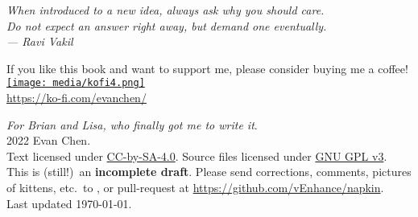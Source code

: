 \begin{titlepage}
	\vspace*{3cm}
	\begin{flushright}
		\large\itshape
		When introduced to a new idea, always ask why you should care. \\[0.2cm]
		Do not expect an answer right away, but demand one eventually. \\[0.8cm]
		--- Ravi Vakil \cite{ref:vakil}
	\end{flushright}

	\vspace*{8em}
	\hrulebar

	\begin{center}
	\begin{minipage}{50ex}
		\centering
		If you like this book and want to support me,
		please consider buying me a coffee! \\[2ex]
		\href{https://ko-fi.com/evanchen}{\texttt{[image: media/kofi4.png]}} \\
		\url{https://ko-fi.com/evanchen/}
	\end{minipage}
	\end{center}

	\vfill
	{
	\small
	\noindent \emph{For Brian and Lisa, who finally got me to write it}. \\[0.4cm]
	\noindent {\copyright} 2022 Evan Chen. \\
	Text licensed under
	\href{https://creativecommons.org/licenses/by-sa/4.0/}{CC-by-SA-4.0}.
	Source files licensed under
	\href{https://choosealicense.com/licenses/gpl-3.0/}{GNU GPL v3}.
	\\[0.4cm]
	This is (still!)\ an \textbf{incomplete draft}.
	Please send corrections, comments, pictures of kittens,
	etc.\ to ,
	or pull-request at \url{https://github.com/vEnhance/napkin}.
	\\[0.4cm]
	\noindent Last updated \today.
	\vspace*{1cm}
	}
\end{titlepage}
